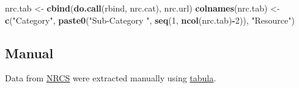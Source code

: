 \documentclass[
]{article}
\newenvironment{Shaded}{\begin{snugshade}}{\end{snugshade}}
\newcommand{\DecValTok}[1]{\textcolor[rgb]{0.00,0.00,0.81}{#1}}
\newcommand{\FunctionTok}[1]{\textcolor[rgb]{0.13,0.29,0.53}{\textbf{#1}}}
\newcommand{\NormalTok}[1]{#1}
\newcommand{\OtherTok}[1]{\textcolor[rgb]{0.56,0.35,0.01}{#1}}
\newcommand{\SpecialCharTok}[1]{\textcolor[rgb]{0.81,0.36,0.00}{\textbf{#1}}}
\newcommand{\StringTok}[1]{\textcolor[rgb]{0.31,0.60,0.02}{#1}}
\begin{document}
\begin{Shaded}
\begin{Highlighting}[]
\NormalTok{nrc.tab }\OtherTok{\textless{}{-}} \FunctionTok{cbind}\NormalTok{(}\FunctionTok{do.call}\NormalTok{(rbind, nrc.cat), nrc.url)}
\FunctionTok{colnames}\NormalTok{(nrc.tab) }\OtherTok{\textless{}{-}} \FunctionTok{c}\NormalTok{(}\StringTok{"Category"}\NormalTok{, }
                       \FunctionTok{paste0}\NormalTok{(}\StringTok{"Sub{-}Category "}\NormalTok{, }\FunctionTok{seq}\NormalTok{(}\DecValTok{1}\NormalTok{, }\FunctionTok{ncol}\NormalTok{(nrc.tab)}\SpecialCharTok{{-}}\DecValTok{2}\NormalTok{)),}
                       \StringTok{"Resource"}\NormalTok{)}
\end{Highlighting}
\end{Shaded}

\subsection{Manual}\label{manual}

Data from
\href{https://www.nrcs.usda.gov/sites/default/files/2023-10/NRCS-CSAF-Mitigation-Activities-List.pdf}{NRCS}
were extracted manually using \href{https://tabula.technology/}{tabula}.
\end{document}
